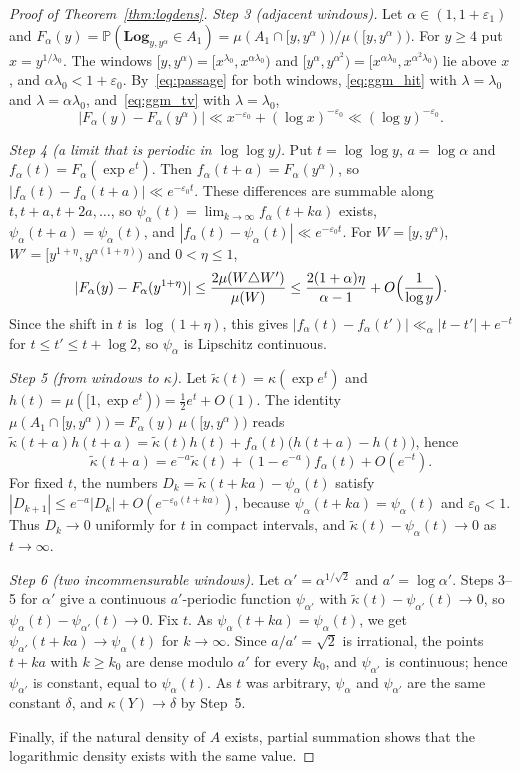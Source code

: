 \documentclass[12pt]{amsart}
\theoremstyle{definition}
\theoremstyle{remark}
\begin{document}
\begin{proof}[Proof of Theorem~\ref{thm:logdens}]
\emph{Step 3 (adjacent windows).} Let $\alpha\in(1,1+\varepsilon_1)$ and $F_\alpha(y)=\mathbb P(\mathbf{Log}_{y,y^\alpha}\in A_1)=\mu(A_1\cap[y,y^\alpha))/\mu([y,y^\alpha))$. For $y\ge4$ put $x=y^{1/\lambda_0}$. The windows $[y,y^\alpha)=[x^{\lambda_0},x^{\alpha\lambda_0})$ and $[y^\alpha,y^{\alpha^2})=[x^{\alpha\lambda_0},x^{\alpha^2\lambda_0})$ lie above $x$, and $\alpha\lambda_0<1+\varepsilon_0$. By~\eqref{eq:passage} for both windows, \eqref{eq:ggm_hit} with $\lambda=\lambda_0$ and $\lambda=\alpha\lambda_0$, and~\eqref{eq:ggm_tv} with $\lambda=\lambda_0$,
\[
|F_\alpha(y)-F_\alpha(y^\alpha)|\ll x^{-\varepsilon_0}+(\log x)^{-\varepsilon_0}\ll(\log y)^{-\varepsilon_0}.
\]

\emph{Step 4 (a limit that is periodic in $\log\log y$).} Put $t=\log\log y$, $a=\log\alpha$ and $f_\alpha(t)=F_\alpha(\exp e^t)$. Then $f_\alpha(t+a)=F_\alpha(y^\alpha)$, so $|f_\alpha(t)-f_\alpha(t+a)|\ll e^{-\varepsilon_0t}$. These differences are summable along $t,t+a,t+2a,\ldots$, so $\psi_\alpha(t)=\lim_{k\to\infty}f_\alpha(t+ka)$ exists, $\psi_\alpha(t+a)=\psi_\alpha(t)$, and $|f_\alpha(t)-\psi_\alpha(t)|\ll e^{-\varepsilon_0t}$. For $W=[y,y^\alpha)$, $W'=[y^{1+\eta},y^{\alpha(1+\eta)})$ and $0<\eta\le1$,
\[
|F_\alpha(y)-F_\alpha(y^{1+\eta})|\le\frac{2\mu(W\triangle W')}{\mu(W)}\le\frac{2(1+\alpha)\eta}{\alpha-1}+O\Bigl(\frac{1}{\log y}\Bigr).
\]
Since the shift in $t$ is $\log(1+\eta)$, this gives $|f_\alpha(t)-f_\alpha(t')|\ll_\alpha|t-t'|+e^{-t}$ for $t\le t'\le t+\log2$, so $\psi_\alpha$ is Lipschitz continuous.

\emph{Step 5 (from windows to $\kappa$).} Let $\tilde\kappa(t)=\kappa(\exp e^t)$ and $h(t)=\mu([1,\exp e^t))=\tfrac12e^t+O(1)$. The identity $\mu(A_1\cap[y,y^\alpha))=F_\alpha(y)\,\mu([y,y^\alpha))$ reads $\tilde\kappa(t+a)h(t+a)=\tilde\kappa(t)h(t)+f_\alpha(t)\bigl(h(t+a)-h(t)\bigr)$, hence
\[
\tilde\kappa(t+a)=e^{-a}\tilde\kappa(t)+(1-e^{-a})f_\alpha(t)+O(e^{-t}).
\]
For fixed $t$, the numbers $D_k=\tilde\kappa(t+ka)-\psi_\alpha(t)$ satisfy $|D_{k+1}|\le e^{-a}|D_k|+O(e^{-\varepsilon_0(t+ka)})$, because $\psi_\alpha(t+ka)=\psi_\alpha(t)$ and $\varepsilon_0<1$. Thus $D_k\to0$ uniformly for $t$ in compact intervals, and $\tilde\kappa(t)-\psi_\alpha(t)\to0$ as $t\to\infty$.

\emph{Step 6 (two incommensurable windows).} Let $\alpha'=\alpha^{1/\sqrt2}$ and $a'=\log\alpha'$. Steps 3--5 for $\alpha'$ give a continuous $a'$-periodic function $\psi_{\alpha'}$ with $\tilde\kappa(t)-\psi_{\alpha'}(t)\to0$, so $\psi_\alpha(t)-\psi_{\alpha'}(t)\to0$. Fix $t$. As $\psi_\alpha(t+ka)=\psi_\alpha(t)$, we get $\psi_{\alpha'}(t+ka)\to\psi_\alpha(t)$ for $k\to\infty$. Since $a/a'=\sqrt2$ is irrational, the points $t+ka$ with $k\ge k_0$ are dense modulo $a'$ for every $k_0$, and $\psi_{\alpha'}$ is continuous; hence $\psi_{\alpha'}$ is constant, equal to $\psi_\alpha(t)$. As $t$ was arbitrary, $\psi_\alpha$ and $\psi_{\alpha'}$ are the same constant $\delta$, and $\kappa(Y)\to\delta$ by Step~5.

Finally, if the natural density of $A$ exists, partial summation shows that the logarithmic density exists with the same value.
\end{proof}
\end{document}
